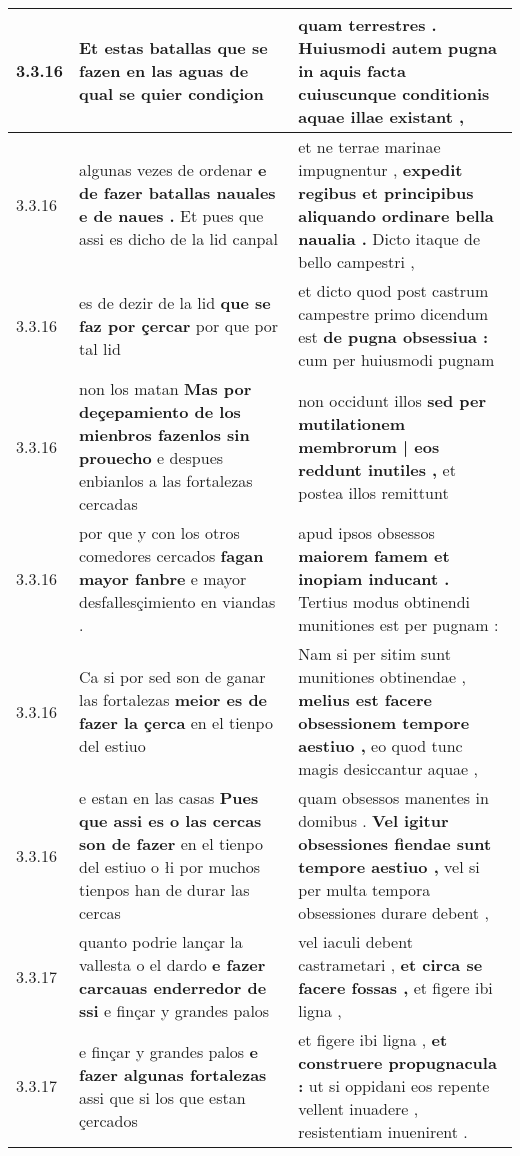 \begin{tabular}{|p{1cm}|p{6.5cm}|p{6.5cm}|}
3.3.16 & Et estas batallas \textbf{ que se fazen en las aguas } de qual se quier condiçion & quam terrestres . \textbf{ Huiusmodi autem pugna in aquis facta } cuiuscunque conditionis aquae illae existant , \\\hline
3.3.16 & algunas vezes de ordenar \textbf{ e de fazer batallas nauales e de naues . } Et pues que assi es dicho de la lid canpal & et ne terrae marinae impugnentur , \textbf{ expedit regibus et principibus aliquando ordinare bella naualia . } Dicto itaque de bello campestri , \\\hline
3.3.16 & es de dezir de la lid \textbf{ que se faz por çercar } por que por tal lid & et dicto quod post castrum campestre primo dicendum est \textbf{ de pugna obsessiua : } cum per huiusmodi pugnam \\\hline
3.3.16 & non los matan \textbf{ Mas por deçepamiento de los mienbros fazenlos sin prouecho } e despues enbianlos a las fortalezas cercadas & non occidunt illos \textbf{ sed per mutilationem membrorum | eos reddunt inutiles , } et postea illos remittunt \\\hline
3.3.16 & por que y con los otros comedores cercados \textbf{ fagan mayor fanbre } e mayor desfallesçimiento en viandas . & apud ipsos obsessos \textbf{ maiorem famem et inopiam inducant . } Tertius modus obtinendi munitiones est per pugnam : \\\hline
3.3.16 & Ca si por sed son de ganar las fortalezas \textbf{ meior es de fazer la çerca } en el tienpo del estiuo & Nam si per sitim sunt munitiones obtinendae , \textbf{ melius est facere obsessionem tempore aestiuo , } eo quod tunc magis desiccantur aquae , \\\hline
3.3.16 & e estan en las casas \textbf{ Pues que assi es o las cercas son de fazer } en el tienpo del estiuo o łi por muchos tienpos han de durar las cercas & quam obsessos manentes in domibus . \textbf{ Vel igitur obsessiones fiendae sunt tempore aestiuo , } vel si per multa tempora obsessiones durare debent , \\\hline
3.3.17 & quanto podrie lançar la vallesta o el dardo \textbf{ e fazer carcauas enderredor de ssi } e finçar y grandes palos & vel iaculi debent castrametari , \textbf{ et circa se facere fossas , } et figere ibi ligna , \\\hline
3.3.17 & e finçar y grandes palos \textbf{ e fazer algunas fortalezas } assi que si los que estan çercados & et figere ibi ligna , \textbf{ et construere propugnacula : } ut si oppidani eos repente vellent inuadere , resistentiam inuenirent . \\\hline

\end{tabular}
